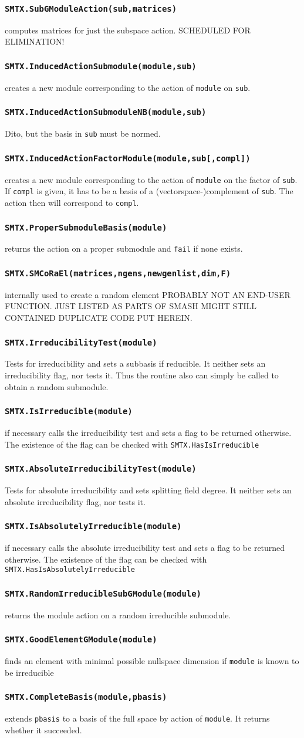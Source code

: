 \documentclass[12pt]{article}
\def\smtxcmd#1{\subsubsection*{{\tt #1}}}
\begin{document}
\smtxcmd{SMTX.SubGModuleAction(sub,matrices)}
computes matrices for just the subspace action. SCHEDULED FOR ELIMINATION!

\smtxcmd{SMTX.InducedActionSubmodule(module,sub)}
creates a new module corresponding to the action of {\tt module} on {\tt sub}.

\smtxcmd{SMTX.InducedActionSubmoduleNB(module,sub)}
Dito, but the basis in {\tt sub} must be normed.

\smtxcmd{SMTX.InducedActionFactorModule(module,sub[,compl])}
creates a new module corresponding to the action of {\tt module} on the
factor of {\tt sub}. If {\tt compl} is given, it has to be a basis of a
(vectorspace-)complement of {\tt sub}. The action then will correspond to
{\tt compl}.

\smtxcmd{SMTX.ProperSubmoduleBasis(module)}
returns the action on a proper submodule and {\tt fail} if none exists.

\smtxcmd{SMTX.SMCoRaEl(matrices,ngens,newgenlist,dim,F)}
internally used to create a random element
PROBABLY NOT AN END-USER FUNCTION. JUST LISTED AS PARTS OF SMASH MIGHT STILL
CONTAINED DUPLICATE CODE PUT HEREIN.

\smtxcmd{SMTX.IrreducibilityTest(module)}
Tests for irreducibility and sets a subbasis if reducible. It neither sets
an irreducibility flag, nor tests it. Thus the routine also can simply be
called to obtain a random submodule.

\smtxcmd{SMTX.IsIrreducible(module)}
if necessary calls the irreducibility test and sets a flag to be returned
otherwise. The existence of the flag can be checked with 
{\tt SMTX.HasIsIrreducible}

\smtxcmd{SMTX.AbsoluteIrreducibilityTest(module)}
Tests for absolute irreducibility and sets splitting field degree. It
neither sets an absolute irreducibility flag, nor tests it.

\smtxcmd{SMTX.IsAbsolutelyIrreducible(module)}
if necessary calls the absolute irreducibility test and sets a flag to be
returned otherwise. The existence of the flag can be checked with 
{\tt SMTX.HasIsAbsolutelyIrreducible}

\smtxcmd{SMTX.RandomIrreducibleSubGModule(module)}
returns the module action on a random irreducible submodule.

\smtxcmd{SMTX.GoodElementGModule(module)}
finds an element with minimal possible nullspace dimension if {\tt module}
is known to be irreducible

\smtxcmd{SMTX.CompleteBasis(module,pbasis)}
extends {\tt pbasis} to a basis of the full space by action of {\tt module}.
It returns whether it succeeded.
\end{document}
